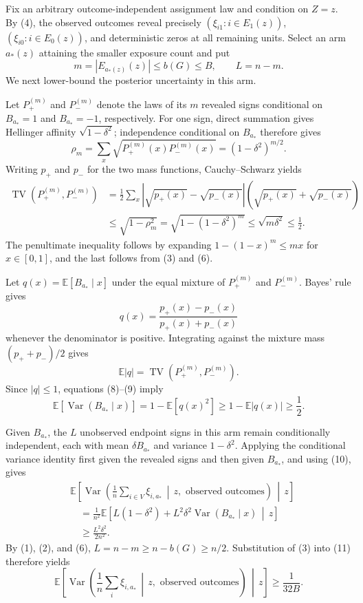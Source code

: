 Fix an arbitrary outcome-independent assignment law and condition on \(Z=z\).  By (4), the observed outcomes reveal precisely \((\xi_{i1}:i\in E_1(z))\), \((\xi_{i0}:i\in E_0(z))\), and deterministic zeros at all remaining units.  Select an arm \(a_*(z)\) attaining the smaller exposure count and put
\[
m=|E_{a_*(z)}(z)|\le b(G)\le B,
\qquad L=n-m. \tag{6}
\]
We next lower-bound the posterior uncertainty in this arm.

Let \(P_+^{(m)}\) and \(P_-^{(m)}\) denote the laws of its \(m\) revealed signs conditional on \(B_{a_*}=1\) and \(B_{a_*}=-1\), respectively.  For one sign, direct summation gives Hellinger affinity \(\sqrt{1-\delta^2}\); independence conditional on \(B_{a_*}\) therefore gives
\[
\rho_m=\sum_x\sqrt{P_+^{(m)}(x)P_-^{(m)}(x)}
=(1-\delta^2)^{m/2}. \tag{7}
\]
Writing \(p_+\) and \(p_-\) for the two mass functions, Cauchy--Schwarz yields
\[
\begin{aligned}
\operatorname{TV}(P_+^{(m)},P_-^{(m)})
&=\frac12\sum_x|\sqrt{p_+(x)}-\sqrt{p_-(x)}|
                    (\sqrt{p_+(x)}+\sqrt{p_-(x)})\\
&\le \sqrt{1-\rho_m^2}
=\sqrt{1-(1-\delta^2)^m}
\le \sqrt{m\delta^2}
\le\frac12. \tag{8}
\end{aligned}
\]
The penultimate inequality follows by expanding \(1-(1-x)^m\le mx\) for \(x\in[0,1]\), and the last follows from (3) and (6).

Let \(q(x)=\mathbb E[B_{a_*}\mid x]\) under the equal mixture of \(P_+^{(m)}\) and \(P_-^{(m)}\).  Bayes' rule gives
\[
q(x)=\frac{p_+(x)-p_-(x)}{p_+(x)+p_-(x)}
\]
whenever the denominator is positive.  Integrating against the mixture mass \((p_++p_-)/2\) gives
\[
\mathbb E|q|=\operatorname{TV}(P_+^{(m)},P_-^{(m)}). \tag{9}
\]
Since \(|q|\le1\), equations (8)--(9) imply
\[
\mathbb E\!\left[\operatorname{Var}(B_{a_*}\mid x)\right]
=1-\mathbb E[q(x)^2]
\ge1-\mathbb E|q(x)|
\ge\frac12. \tag{10}
\]

Given \(B_{a_*}\), the \(L\) unobserved endpoint signs in this arm remain conditionally independent, each with mean \(\delta B_{a_*}\) and variance \(1-\delta^2\).  Applying the conditional variance identity first given the revealed signs and then given \(B_{a_*}\), and using (10), gives
\[
\begin{aligned}
&\mathbb E\!\left[
\operatorname{Var}\!\left(
\frac1n\sum_{i\in V}\xi_{i,a_*}\,\middle|\,
z,\text{ observed outcomes}
\right)\,\middle|\,z\right]\\
&\quad=\frac1{n^2}\mathbb E\!\left[
L(1-\delta^2)+L^2\delta^2
\operatorname{Var}(B_{a_*}\mid x)\,\middle|\,z\right]\\
&\quad\ge\frac{L^2\delta^2}{2n^2}. \tag{11}
\end{aligned}
\]
By (1), (2), and (6), \(L=n-m\ge n-b(G)\ge n/2\).  Substitution of (3) into (11) therefore yields
\[
\mathbb E\!\left[
\operatorname{Var}\!\left(
\frac1n\sum_i\xi_{i,a_*}\,\middle|\,
z,\text{ observed outcomes}
\right)\,\middle|\,z\right]
\ge \frac1{32B}. \tag{12}
\]

